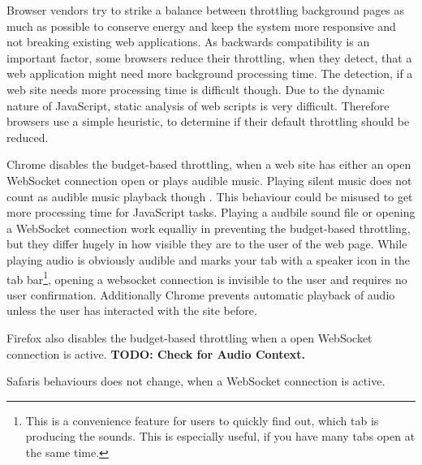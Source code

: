 \documentclass[
	ngerman,
	ruledheaders=section,%
	class=report,%
	thesis={type=bachelor},%
	accentcolor=9c,%
	custommargins=true,%
	marginpar=false,%
	parskip=half-,%
	fontsize=11pt,%
]{tudapub}
\begin{document}
  Browser vendors try to strike a balance between throttling background pages as much as possible to conserve energy and keep the system more responsive and not breaking existing web applications. As backwards compatibility is an important factor, some browsers reduce their throttling, when they detect, that a web application might need more background processing time. The detection, if a web site needs more processing time is difficult though. Due to the dynamic nature of JavaScript, static analysis of web scripts is very difficult. Therefore browsers use a simple heuristic, to determine if their default throttling should be reduced.

  Chrome disables the budget-based throttling, when a web site has either an open WebSocket connection open or plays audible music. Playing silent music does not count as audible music playback though \cite{chrome-background-tabs}. This behaviour could be misused to get more processing time for JavaScript tasks. Playing a audbile sound file or opening a WebSocket connection work equalliy in preventing the budget-based throttling, but they differ hugely in how visible they are to the user of the web page. While playing audio is obviously audible and marks your tab with a speaker icon in the tab bar\footnote{This is a convenience feature for users to quickly find out, which tab is producing the sounds. This is especially useful, if you have many tabs open at the same time.}, opening a websocket connection is invisible to the user and requires no user confirmation. Additionally Chrome prevents automatic playback of audio unless the user has interacted with the site before.

  Firefox also disables the budget-based throttling when a open WebSocket connection is active. \textbf{TODO: Check for Audio Context.}

  Safaris behaviours does not change, when a WebSocket connection is active.
\end{document}
